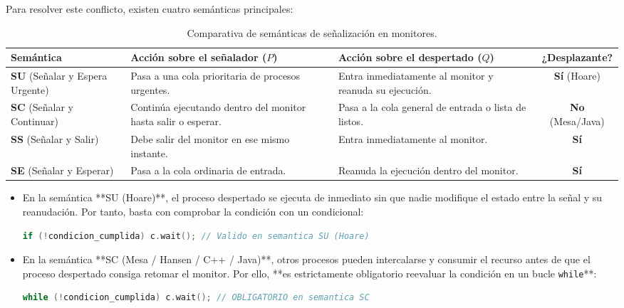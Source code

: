 Para resolver este conflicto, existen cuatro semánticas principales:

\begin{table}[h!]
\centering
\small
\renewcommand{\arraystretch}{1.3}
\begin{tabular}{@{}lp{4.2cm}p{4.2cm}c@{}}
\toprule
\textbf{Semántica} & \textbf{Acción sobre el señalador ($P$)} & \textbf{Acción sobre el despertado ($Q$)} & \textbf{¿Desplazante?} \\ \midrule
\textbf{SU} (Señalar y Espera Urgente) & Pasa a una cola prioritaria de procesos urgentes. & Entra inmediatamente al monitor y reanuda su ejecución. & \textbf{Sí} (Hoare) \\
\textbf{SC} (Señalar y Continuar) & Continúa ejecutando dentro del monitor hasta salir o esperar. & Pasa a la cola general de entrada o lista de listos. & \textbf{No} (Mesa/Java) \\
\textbf{SS} (Señalar y Salir) & Debe salir del monitor en ese mismo instante. & Entra inmediatamente al monitor. & \textbf{Sí} \\
\textbf{SE} (Señalar y Esperar) & Pasa a la cola ordinaria de entrada. & Reanuda la ejecución dentro del monitor. & \textbf{Sí} \\ \bottomrule
\end{tabular}
\caption{Comparativa de semánticas de señalización en monitores.}
\end{table}

\begin{aviso}
\begin{itemize}[leftmargin=*]
    \item En la semántica **SU (Hoare)**, el proceso despertado se ejecuta de inmediato sin que nadie modifique el estado entre la señal y su reanudación. Por tanto, basta con comprobar la condición con un condicional:
    \begin{lstlisting}[language=C++]
    if (!condicion_cumplida) c.wait(); // Valido en semantica SU (Hoare)
    \end{lstlisting}
    \item En la semántica **SC (Mesa / Hansen / C++ / Java)**, otros procesos pueden intercalarse y consumir el recurso antes de que el proceso despertado consiga retomar el monitor. Por ello, **es estrictamente obligatorio reevaluar la condición en un bucle \texttt{while}**:
    \begin{lstlisting}[language=C++]
    while (!condicion_cumplida) c.wait(); // OBLIGATORIO en semantica SC
    \end{lstlisting}
\end{itemize}
\end{aviso}


